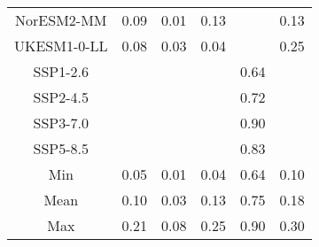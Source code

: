 \begin{table*}[t]
\begin{tabular}{c|rrr|rr}
NorESM2-MM & 0.09 & 0.01 & 0.13 &  & 0.13 \\
UKESM1-0-LL & 0.08 & 0.03 & 0.04 &  & 0.25 \\
SSP1-2.6 &  &  &  & 0.64 &  \\
SSP2-4.5 &  &  &  & 0.72 &  \\
SSP3-7.0 &  &  &  & 0.90 &  \\
SSP5-8.5 &  &  &  & 0.83 &  \\
\midrule
Min & 0.05 & 0.01 & 0.04 & 0.64 & 0.10 \\
Mean & 0.10 & 0.03 & 0.13 & 0.75 & 0.18 \\
Max & 0.21 & 0.08 & 0.25 & 0.90 & 0.30 \\
\bottomrule
\end{tabular}
\end{table*}
